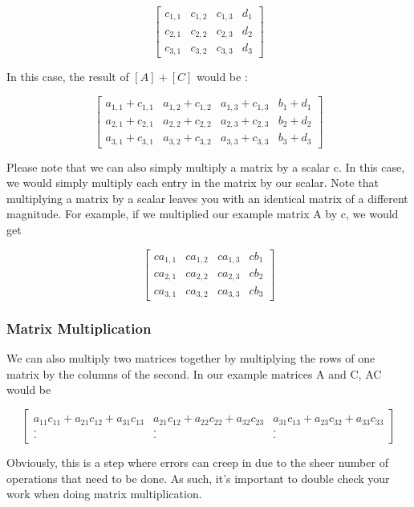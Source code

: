 $$
\begin{bmatrix}
c_{1,1}&c_{1,2}&c_{1,3}&d_{1}\\
c_{2,1}&c_{2,2}&c_{2,3}&d_{2}\\ 
c_{3,1}&c_{3,2}&c_{3,3}&d_{3}
\end{bmatrix}
$$

In this case, the result of $[A] + [C]$ would be :

$$
\begin{bmatrix}
a_{1,1}+c_{1,1}&a_{1,2}+c_{1,2}&a_{1,3}+c_{1,3}&b_{1}+d_{1}\\
a_{2,1}+c_{2,1}&a_{2,2}+c_{2,2}&a_{2,3}+c_{2,3}&b_{2}+d_{2}\\ 
a_{3,1}+c_{3,1}&a_{3,2}+c_{3,2}&a_{3,3}+c_{3,3}&b_{3}+d_{3}
\end{bmatrix}
$$

Please note that we can also simply multiply a matrix by a scalar c.
In this case, we would simply multiply each entry in the matrix by our scalar. Note that multiplying a matrix by a scalar leaves you with an identical matrix of a different magnitude.
For example, if we multiplied our example matrix A by c, we would get

$$
\begin{bmatrix}
ca_{1,1}&ca_{1,2}&ca_{1,3}&cb_{1}\\
ca_{2,1}&ca_{2,2}&ca_{2,3}&cb_{2}\\ 
ca_{3,1}&ca_{3,2}&ca_{3,3}&cb_{3}
\end{bmatrix}
$$


\subsubsection{Matrix Multiplication} 

We can also multiply two matrices together by multiplying the rows of one matrix by the columns of the second. In our example matrices A and C, AC would be

$$
\begin{bmatrix}
a_{11}c_{11}+a_{21}c_{12}+a_{31}c_{13}&a_{21}c_{12}+a_{22}c_{22}+a_{32}c_{23}&a_{31}c_{13}+a_{23}c_{32}+a_{33}c_{33}\\
.&.&.\\
.&.&.
\end{bmatrix}
$$

Obviously, this is a step where errors can creep in due to the sheer number of operations that need to be done. As such, it's important to double check your work when doing matrix multiplication. 

